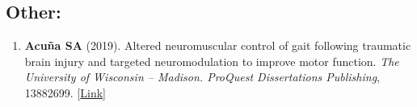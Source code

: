 \documentclass[letterpaper, 10pt]{article}
\begin{document}


\subsection{Other:}
\begin{enumerate}
    \item \textbf{Acuña SA} (2019). Altered neuromuscular control of gait following traumatic brain injury and targeted neuromodulation to improve motor function. \textit{The University of Wisconsin -- Madison. ProQuest Dissertations Publishing}, 13882699. [\href{https://www.proquest.com/docview/2229834647}{Link}]
\end{enumerate}

\end{document}
